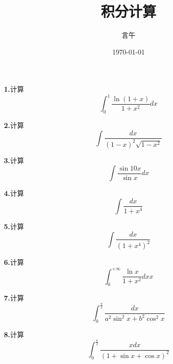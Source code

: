 \documentclass[10pt]{article}
\title{积分计算}
\author{言午}
\date{\today}
\begin{document}
\maketitle
\textbf{1.}计算
$$
\int_0^1{\frac{\ln \left( 1+x \right)}{1+x^2}dx}
$$

\textbf{2.}计算
$$
\int{\frac{dx}{\left( 1-x \right) ^2\sqrt{1-x^2}}}
$$

\textbf{3.}计算
$$
\int{\frac{\sin 10x}{\sin x}dx}
$$

\textbf{4.}计算
$$
\int{\frac{dx}{1+x^4}}
$$

\textbf{5.}计算
$$
\int{\frac{dx}{\left( 1+x^4 \right) ^2}}
$$

\textbf{6.}计算
$$
\int_0^{+\infty}{\frac{\ln x}{1+x^2}dx}x
$$

\textbf{7.}计算
$$
\int_0^{\frac{\pi}{2}}{\frac{dx}{a^2\sin ^2x+b^2\cos ^2x}}
$$

\textbf{8.}计算
$$
\int_0^{\frac{\pi}{2}}{\frac{xdx}{\left( 1+\sin x+\cos x \right) ^2}}
$$
\end{document}
